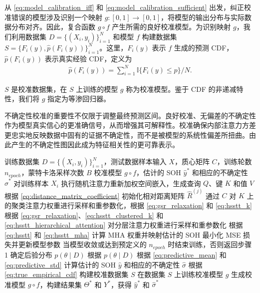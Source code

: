 \documentclass[UTF8,journal,twoside,web]{ieeecolor}
\newcommand{\newtext}[1]{{\leavevmode\color{blue}#1}}
\begin{document}
从 \eqref{eq:model_calibration_iff} 和 \eqref{eq:model_calibration_sufficient} 出发，纠正校准错误的模型涉及识别一个映射 $g: [0,1] \to [0,1]$，将模型的输出分布与实际数据分布对齐。因此，复合函数 $g \circ f$ 产生所需的良好校准模型。为识别映射 $g$，我们利用数据集 $D=\{(X_{i},y_{i})\}_{i=1}^{N}$ 和模型 $f$ 构建数据集 $S=\{F_{i}(y), \hat{p}(F_{i}(y))\}_{i=1}^{N}$。这里，$F_{i}(y)$ 表示 $f$ 生成的预测 CDF，$\hat{p}(F_{i}(y))$ 表示真实经验 CDF，定义为
\begin{equation}
\begin{aligned}
\hat{p}(F_{i}(y)) = \sum\nolimits_{i=1}^{N}\mathbb{I}\{F_{i}(y)\leq p\}/N.
\end{aligned}
\label{eq:true_empirical_cdf}
\end{equation}%

$S$ 是校准数据集，在 $S$ 上训练的模型 $g$ 称为校准模型。鉴于 CDF 的非递减特性，我们将 $g$ 指定为等渗回归器。

\newtext{不确定性校准的重要性不仅限于调整最终预测区间。良好校准、无偏差的不确定性作为模型真实信心的更准确信号，从而增强其可解释性。校准确保内部注意力方差更忠实地反映数据中固有的证据不确定性，而不是被模型的系统性偏差所扭曲。由此产生的不确定性图因此成为特征相关性的更可靠表示。}

\begin{algorithm}[t]
  \small
  \caption{用于可信 SOH 估计的 HSSTT}
  \label{alg:hsstt}
  \begin{algorithmic}[1]
      \REQUIRE 训练数据集 $D=\{(X_{i}, y_{i})\}_{i=1}^{N}$，测试数据样本输入 $X$，质心矩阵 $C$，训练轮数 $n_{epoch}$，蒙特卡洛采样次数 $B$
      \ENSURE 校准模型 $g \circ f$，估计的 SOH $\hat{y}^{*}$ 和相应的不确定性 $\hat{\sigma}^{*}$
      \STATE 对训练样本 $X_{i}$ 执行随机注意力重新加权空间嵌入，生成查询 $Q$、键 $K$ 和值 $V$
      \STATE 根据 \eqref{eq:distance_matrix_coefficient} 初始化相对距离矩阵 $\hat{R}^{(j)}$
      \STATE 通过 $C$ 对 $K$ 上的聚类注意力权重进行采样和重参数化，根据 \eqref{eq:gsr_relaxation} 和 \eqref{eq:hsstt_k}
      \STATE 根据 \eqref{eq:gsr_relaxation}、\eqref{eq:hsstt_clustered_k} 和 \eqref{eq:hsstt_hierarchical_attention} 对分层注意力权重进行采样和重参数化
      \STATE 根据 \eqref{eq:hsstt} 和 \eqref{eq:hsstt_mha} 计算 MHA 权重并映射估计的 SOH
      \STATE 最小化 MSE 损失并更新模型参数
      \STATE 当模型收敛或达到预定义的 $n_{epoch}$ 时结束训练，否则返回步骤 1
      \STATE 确定后验分布 $p(\theta \mid D)$
      \STATE 根据 $p(\theta \mid D)$ 根据 \eqref{eq:predictive_mean} 和 \eqref{eq:predictive_std} 计算估计的 SOH $\hat{y}$ 和相应的不确定性 $\hat{\sigma}$
      \STATE 根据 \eqref{eq:true_empirical_cdf} 构建校准数据集 $S$
      \STATE 在数据集 $S$ 上训练校准模型 $g$
      \STATE 生成校准模型 $g \circ f$，构建结果集 $\Theta^{*}$ 和 $Y^{*}$，获得 $\hat{y}^{*}$ 和 $\hat{\sigma}^{*}$
  \end{algorithmic}
\end{algorithm}
\end{document}
